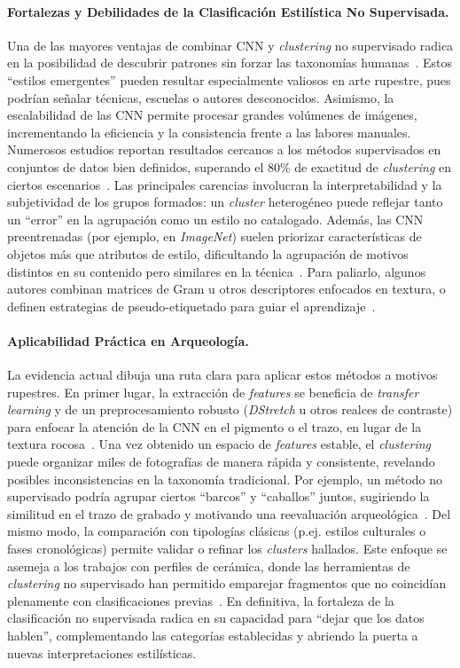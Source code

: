 \paragraph{Fortalezas y Debilidades de la Clasificación Estilística No Supervisada.}
Una de las mayores ventajas de combinar CNN y \textit{clustering} no supervisado radica en la posibilidad de descubrir patrones sin forzar las taxonomías humanas~\cite{castellano2022,wynen2018}.
Estos “estilos emergentes” pueden resultar especialmente valiosos en arte rupestre, pues podrían señalar técnicas, escuelas o autores desconocidos. Asimismo, la escalabilidad de las CNN permite procesar grandes volúmenes de imágenes, incrementando la eficiencia y la consistencia frente a las labores manuales.
Numerosos estudios reportan resultados cercanos a los métodos supervisados en conjuntos de datos bien definidos, superando el 80\% de exactitud de \textit{clustering} en ciertos escenarios~\cite{xue2023}.
Las principales carencias involucran la interpretabilidad y la subjetividad de los grupos formados: un \textit{cluster} heterogéneo puede reflejar tanto un “error” en la agrupación como un estilo no catalogado.
Además, las CNN preentrenadas (por ejemplo, en \textit{ImageNet}) suelen priorizar características de objetos más que atributos de estilo, dificultando la agrupación de motivos distintos en su contenido pero similares en la técnica~\cite{gairola2020}.
Para paliarlo, algunos autores combinan matrices de Gram u otros descriptores enfocados en textura, o definen estrategias de pseudo-etiquetado para guiar el aprendizaje~\cite{gairola2020,dangeti2024}.

\paragraph{Aplicabilidad Práctica en Arqueología.}
La evidencia actual dibuja una ruta clara para aplicar estos métodos a motivos rupestres.
En primer lugar, la extracción de \textit{features} se beneficia de \textit{transfer learning} y de un preprocesamiento robusto (\textit{DStretch} u otros realces de contraste) para enfocar la atención de la CNN en el pigmento o el trazo, en lugar de la textura rocosa~\cite{guerin2018}.
Una vez obtenido un espacio de \textit{features} estable, el \textit{clustering} puede organizar miles de fotografías de manera rápida y consistente, revelando posibles inconsistencias en la taxonomía tradicional.
Por ejemplo, un método no supervisado podría agrupar ciertos “barcos” y “caballos” juntos, sugiriendo la similitud en el trazo de grabado y motivando una reevaluación arqueológica~\cite{gairola2020}.
Del mismo modo, la comparación con tipologías clásicas (p.ej. estilos culturales o fases cronológicas) permite validar o refinar los \textit{clusters} hallados.
Este enfoque se asemeja a los trabajos con perfiles de cerámica, donde las herramientas de \textit{clustering} no supervisado han permitido emparejar fragmentos que no coincidían plenamente con clasificaciones previas~\cite{parisotto2022}.
En definitiva, la fortaleza de la clasificación no supervisada radica en su capacidad para “dejar que los datos hablen”, complementando las categorías establecidas y abriendo la puerta a nuevas interpretaciones estilísticas.

